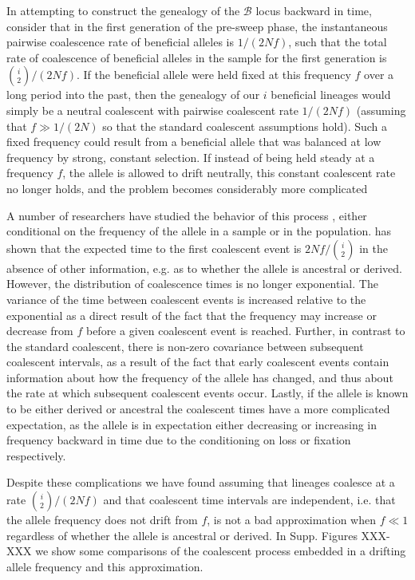 \documentclass[a4paper,10pt]{article}
\newcommand{\fancyB}{$\mathcal B$ }
\begin{document}
In attempting to construct the genealogy of the \fancyB locus backward in time, consider that in the first generation of the pre-sweep phase, the instantaneous pairwise coalescence rate of beneficial alleles is $1/\left(2Nf\right)$, such that the total rate of coalescence of beneficial alleles in the sample for the first generation is ${i \choose 2}/\left(2Nf\right)$. If the beneficial allele were held fixed at this frequency $f$ over a long period into the past, then the genealogy of our $i$ beneficial lineages would simply be a neutral coalescent with pairwise coalescent rate $1/(2 N f)$ (assuming that $f \gg 1/(2N)$ so that the standard coalescent assumptions hold). Such a fixed frequency could result from a beneficial allele that was balanced at low frequency by strong, constant selection. If instead of being held steady at a frequency $f$, the allele is allowed to drift neutrally, this constant coalescent rate no longer holds, and the problem becomes considerably more complicated

A number of researchers have studied the behavior of this process \citep{XXXX}, either conditional on the frequency of the allele in a sample or in the population. \cite{Wiuf:2000js} has shown that the expected time to the first coalescent event is $2 N f/ {i \choose 2}$ in the absence of other information, e.g. as to whether the allele is ancestral or derived. However, the distribution of coalescence times is no longer exponential. The variance of the time between coalescent events is increased relative to the exponential as a direct result of the fact that the frequency may increase or decrease from $f$ before a given coalescent event is reached. Further, in contrast to the standard coalescent, there is non-zero covariance between subsequent coalescent intervals, as a result of the fact that early coalescent events contain information about how the frequency of the allele has changed, and thus about the rate at which subsequent coalescent events occur. Lastly, if the allele is known to be either derived or ancestral the coalescent times have a more complicated expectation, as the allele is in expectation either decreasing or increasing in frequency backward in time due to the conditioning on loss or fixation respectively.

Despite these complications we have found assuming that lineages coalesce at a rate $ {i \choose 2}/(2 N f)$ and that coalescent time intervals are independent, i.e. that the allele frequency does not drift from $f$, is not a bad approximation when $f \ll 1$ regardless of whether the allele is ancestral or derived. In Supp. Figures XXX-XXX we show some comparisons of the coalescent process embedded in a drifting allele frequency and this approximation. 
\end{document}
